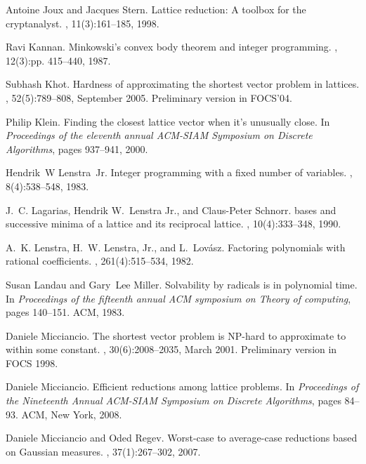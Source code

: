 \documentclass[11pt]{article}
\begin{document}
\begin{thebibliography}{DKRS03}
Antoine Joux and Jacques Stern.
\newblock Lattice reduction: A toolbox for the cryptanalyst.
, 11(3):161--185, 1998.

Ravi Kannan.
\newblock Minkowski's convex body theorem and integer programming.
, 12(3):pp. 415--440, 1987.

Subhash Khot.
\newblock Hardness of approximating the shortest vector problem in lattices.
, 52(5):789--808, September 2005.
\newblock Preliminary version in FOCS'04.

Philip Klein.
\newblock Finding the closest lattice vector when it's unusually close.
\newblock In {\em Proceedings of the eleventh annual ACM-SIAM {S}ymposium on
  {D}iscrete {A}lgorithms}, pages 937--941, 2000.

Hendrik~W Lenstra~Jr.
\newblock Integer programming with a fixed number of variables.
, 8(4):538--548, 1983.

J.~C. Lagarias, Hendrik W.~Lenstra Jr., and Claus-Peter Schnorr.
 bases and successive minima of a lattice and its
  reciprocal lattice.
, 10(4):333--348, 1990.

A.~K. Lenstra, H.~W. Lenstra, Jr., and L.~Lov{\'a}sz.
\newblock Factoring polynomials with rational coefficients.
, 261(4):515--534, 1982.

Susan Landau and Gary~Lee Miller.
\newblock Solvability by radicals is in polynomial time.
\newblock In {\em Proceedings of the fifteenth annual ACM symposium on Theory
  of computing}, pages 140--151. ACM, 1983.

Daniele Micciancio.
\newblock The shortest vector problem is {NP}-hard to approximate to within
  some constant.
, 30(6):2008--2035, March 2001.
\newblock Preliminary version in FOCS 1998.

Daniele Micciancio.
\newblock Efficient reductions among lattice problems.
\newblock In {\em Proceedings of the {N}ineteenth {A}nnual {ACM}-{SIAM}
  {S}ymposium on {D}iscrete {A}lgorithms}, pages 84--93. ACM, New York, 2008.

Daniele Micciancio and Oded Regev.
\newblock Worst-case to average-case reductions based on {G}aussian measures.
, 37(1):267--302, 2007.


\end{thebibliography}
\end{document}
